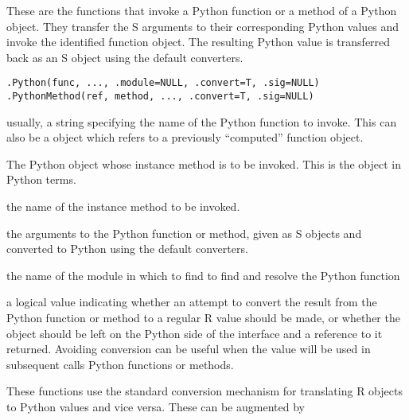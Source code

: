 \begin{Description}\relax
These are the functions that invoke a Python function
or a method of a Python object.
They transfer the S arguments to their corresponding
Python values and invoke the identified function object.
The resulting Python value is transferred back as an 
S object using the default converters.\end{Description}
\begin{Usage}
\begin{verbatim}
.Python(func, ..., .module=NULL, .convert=T, .sig=NULL)
.PythonMethod(ref, method, ..., .convert=T, .sig=NULL)
\end{verbatim}
\end{Usage}
\begin{Arguments}
\begin{ldescription}
\item[\code{func}] usually, a string specifying the name of the Python function to invoke.
This can also be a  object which refers to a previously
``computed'' function object.
\item[\code{ref}] The Python object whose instance method is to be invoked. This is the 
 object in Python terms.
\item[\code{method}] the name of the instance method to be invoked.
\item[\code{...}] the arguments to the Python function or method, given as S objects
and converted to Python using the default converters.
\item[\code{.module}] the name of the module in which to find to find and resolve the
Python function
\item[\code{.convert}] a logical value indicating whether an attempt to convert 
the result from the Python function or method to a regular R value
should be made, or whether the object should be left on the Python side of
the interface and a reference to it returned. Avoiding conversion can be useful
when the value will be used in subsequent calls Python functions or methods.
\item[\code{.sig}] 
\end{ldescription}
\end{Arguments}
\begin{Details}\relax
These functions use the standard conversion mechanism for
translating R objects to Python values and vice versa.
These can be augmented by\end{Details}
